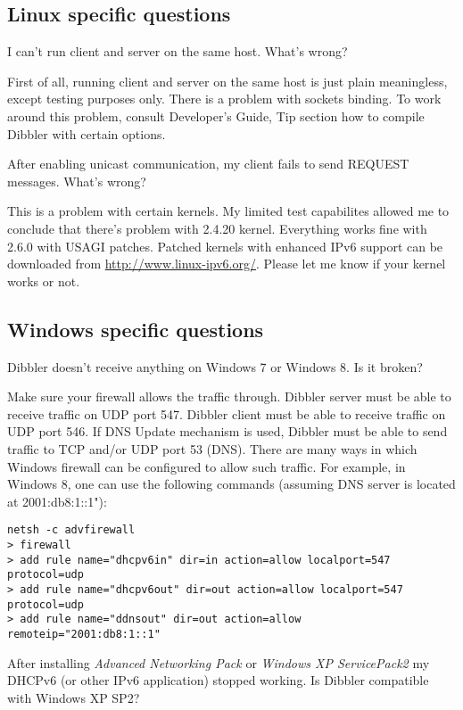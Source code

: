 \subsection{Linux specific questions}

\Q I can't run client and server on the same host. What's wrong?

\A First of all, running client and server on the same host is just
plain meaningless, except testing purposes only. There is a problem
with sockets binding. To work around this problem, consult Developer's
Guide, Tip section how to compile Dibbler with certain options.

\Q After enabling unicast communication, my client fails to send
REQUEST messages. What's wrong?

\A This is a problem with certain kernels. My limited test capabilites
allowed me to conclude that there's problem with 2.4.20
kernel. Everything works fine with 2.6.0 with USAGI patches. Patched
kernels with enhanced IPv6 support can be downloaded from
\url{http://www.linux-ipv6.org/}. Please let me know if your kernel
works or not.

\subsection{Windows specific questions}

\Q Dibbler doesn't receive anything on Windows 7 or Windows 8. Is it
broken?

\A Make sure your firewall allows the traffic through. Dibbler server
must be able to receive traffic on UDP port 547. Dibbler client must
be able to receive traffic on UDP port 546. If DNS Update mechanism is
used, Dibbler must be able to send traffic to TCP and/or UDP port 53
(DNS). There are many ways in which Windows firewall can be configured
to allow such traffic. For example, in Windows 8, one can use the
following commands (assuming DNS server is located at 2001:db8:1::1"):
\begin{lstlisting}
netsh -c advfirewall
> firewall
> add rule name="dhcpv6in" dir=in action=allow localport=547 protocol=udp
> add rule name="dhcpv6out" dir=out action=allow localport=547 protocol=udp
> add rule name="ddnsout" dir=out action=allow remoteip="2001:db8:1::1"
\end{lstlisting}

\Q After installing \emph{Advanced Networking Pack} or \emph{Windows XP
  ServicePack2} my DHCPv6 (or other IPv6 application) stopped
working. Is Dibbler compatible with Windows XP SP2?

